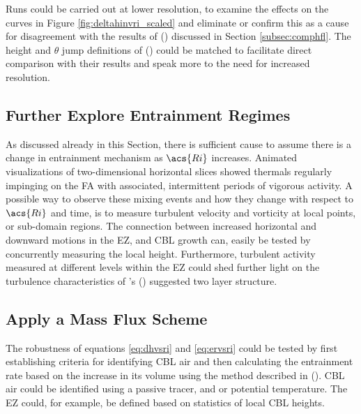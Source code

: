 Runs could be carried out at lower resolution, to examine the effects on the curves in Figure \ref{fig:deltahinvri_scaled} and eliminate or confirm this as a cause for disagreement with the results of \citeauthor{FedConzMir04} (\citeyear{FedConzMir04}) discussed in Section \ref{subsec:comphfl}.  The height and $\theta$ jump definitions of \citeauthor{GarciaMellado} (\citeyear{GarciaMellado}) could be matched to facilitate direct comparison with their results and speak more to the need for increased resolution.

\subsection{Further Explore Entrainment Regimes}

As discussed already in this Section, there is sufficient cause to assume there is a change in entrainment mechanism as $\acs{Ri}$ increases.  Animated visualizations of two-dimensional horizontal slices showed thermals regularly impinging on the \acs{FA} with associated, intermittent periods of vigorous activity.  A possible way to observe these mixing events and how they change with respect to $\acs{Ri}$ and time, is to measure turbulent velocity and vorticity at local points, or sub-domain regions.  The connection between increased horizontal and downward motions in the \acs{EZ}, and \acs{CBL} growth can, easily be tested by concurrently measuring the local height. Furthermore, turbulent activity measured at different levels within the \acs{EZ} could shed further light on the turbulence characteristics of \citeauthor{GarciaMellado}'s (\citeyear{GarciaMellado}) suggested two layer structure.\\     

\subsection{Apply a Mass Flux Scheme}

The robustness of equations \ref{eq:dhvsri} and \ref{eq:ervsri} could be tested by first establishing criteria for identifying \acs{CBL} air and then calculating the entrainment rate based on the increase in its volume using the method described in \citeauthor{DawAus} (\citeyear{DawAus}).  \acs{CBL} air could be identified using a passive tracer, and or potential temperature.  The \acs{EZ} could, for example, be defined based on statistics of local \acs{CBL} heights.   

\FloatBarrier


\endinput

Any text after an \endinput is ignored.
You could put scraps here or things in progress.
